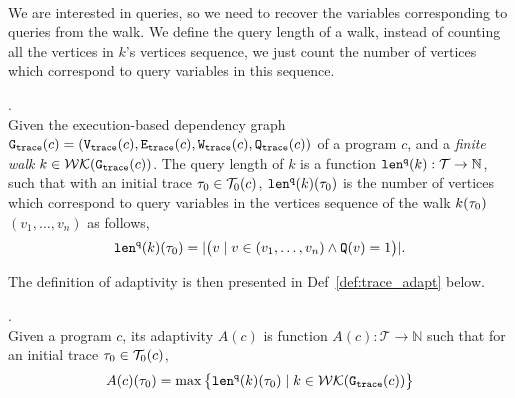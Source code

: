{\\
We are interested in queries, so we need to recover the 
variables corresponding to queries from the walk. We define the query length of a walk, 
instead of counting all 
the vertices in $k$'s vertices sequence, we just count the number of vertices which correspond to query variables in this sequence.
%
\begin{defn}.
\label{def:qlen}
\\
Given 
the execution-based dependency graph $\mathtt{{G_{trace}}}({c}) = (\mathtt{{V_{trace}}}({c}), \mathtt{{E_{trace}}}({c}), \mathtt{{W_{trace}}}({c}), \mathtt{{Q_{trace}}}({c}))$ of a program $c$,
 and a \emph{finite walk} 
 $k \in \mathcal{WK}(\mathtt{{G_{trace}}}(c))$. 
The query length of $k$ is a function $\mathtt{len}^{\tt q}(k): \mathcal{T} \to \mathbb{N}$, such that with an initial trace  $\mathtt{\tau}_0 \in \mathcal{T}_0(c)$, $\mathtt{len}^{\tt q}(k)(\mathtt{\tau}_0)$ is
the number of vertices which correspond to query variables in the vertices sequence of the walk $k(\mathtt{\tau}_0)$
$(v_1, \ldots, v_{n})$ as follows, 
\[
  \mathtt{len}^{\tt q}(k)(\mathtt{\tau}_0) = |\big( v \mid v \in (v_1, \ldots, v_{n}) \land \mathtt{Q}(v) = 1 \big)|.
\]
\end{defn}
}
The definition of adaptivity is then presented in Def~\ref{def:trace_adapt} below.

\begin{defn}
  .
  \label{def:trace_adapt}
  \\
  Given a program ${c}$, 
  its adaptivity $A(c)$ is function 
  $A(c) : \mathcal{T} \to \mathbb{N}$ such that for an
  initial trace $\mathtt{\tau}_0 \in \mathcal{T}_0(c)$, 
 $$
  A(c)(\mathtt{\tau}_0) = \max \big 
  \{ \mathtt{len}^{\tt q}(k)(\mathtt{\tau}_0) \mid k \in \mathcal{WK}(\mathtt{{G_{trace}}}(c)) \big \} $$
  \end{defn}